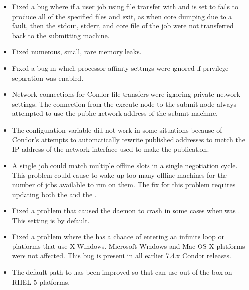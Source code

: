 \begin{itemize}

\item
  Fixed a bug where if a user job using file transfer with
   and 
  is set to  fails
  to produce all of the specified files and exit, as when core
  dumping due to a fault, then the stdout, stderr, and core file of the
  job were not transferred back to the submitting machine.

\item
  Fixed numerous, small, rare memory leaks.

\item 
  Fixed a bug in which processor affinity settings were ignored if
  privilege separation was enabled.

\item Network connections for Condor file transfers were ignoring
  private network settings.  The connection from the execute node to
  the submit node always attempted to use the public network address
  of the submit machine.

\item The configuration variable  did not work
in some situations
because of Condor's attempts to automatically rewrite published addresses to
match the IP address of the network interface used to make the publication.

\item A single job could match multiple offline slots in a single
negotiation cycle.  This problem could cause  to
wake up too many offline machines for the number of jobs available
to run on them.  The fix for this problem requires updating both
the  and the .

\item Fixed a problem that caused the  daemon to
crash in some cases when  was .
This setting is  by default.

\item Fixed a problem where the  has a chance of
entering an infinite loop on platforms that use X-Windows.
Microsoft Windows and Mac OS X platforms were not affected.  This bug is
present in all earlier 7.4.x Condor releases.

\item The default path to  has been improved so that
   can use  out-of-the-box on RHEL 5 platforms.


\end{itemize}
